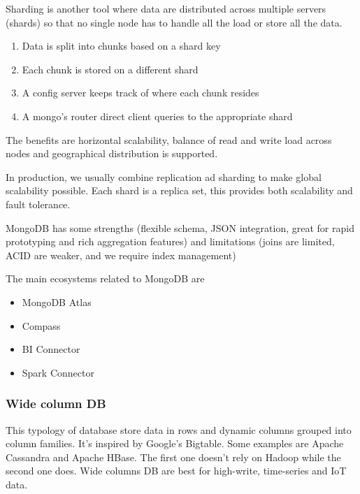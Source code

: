 \vspace{10pt}

Sharding is another tool where data are distributed across multiple servers (shards) so that no single node has to handle all the load or store all the data. 
\begin{enumerate}
    \item Data is split into chunks based on a shard key
    \item Each chunk is stored on a different shard
    \item A config server keeps track of where each chunk resides
    \item A mongo's router direct client queries to the appropriate shard
\end{enumerate}

The benefits are horizontal scalability, balance of read and write load across nodes and geographical distribution is supported.

\vspace{10pt}

In production, we usually combine replication ad sharding to make global scalability possible. Each shard is a replica set, this provides both scalability and fault tolerance. 

\vspace{10pt}

MongoDB has some strengths (flexible schema, JSON integration, great for rapid prototyping and rich aggregation features) and limitations (joins are limited, ACID are weaker, and we require index management)

\vspace{10pt}

The main ecosystems related to MongoDB are 
\begin{itemize}
    \item MongoDB Atlas
    \item Compass
    \item BI Connector
    \item Spark Connector
\end{itemize}


\subsubsection{Wide column DB}

This typology of database store data in rows and dynamic columns grouped into column families. It's inspired by Google's Bigtable. Some examples are Apache Cassandra and Apache HBase. The first one doesn't rely on Hadoop while the second one does. Wide columns DB are best for high-write, time-series and IoT data. 

